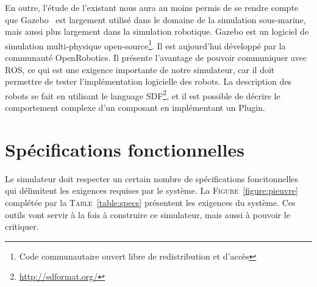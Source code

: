         En outre, l'étude de l'existant nous aura au moins permis de se rendre compte que \gls{Gazebo}~\cite{Koenig-gazebo} est largement utilisé dans le domaine de la simulation sous-marine, mais aussi plus largement dans la simulation robotique. \gls{Gazebo} est un logiciel de simulation multi-physique open-source\footnote{Code communautaire ouvert libre de redistribution et d'accès}. Il est aujourd'hui développé par la communauté \gls{OpenRobotics}. Il présente l'avantage de pouvoir communiquer avec \gls{ROS}, ce qui est une exigence importante de notre simulateur, car il doit permettre de tester l'implémentation logicielle des robots. La description des robots se fait en utilisant le language \gls{SDF}\footnote{\url{http://sdformat.org/}}, et il est possible de décrire le comportement complexe d'un composant en implémentant un \gls{Plugin}.


    \section{Spécifications fonctionnelles}
        \label{sec:spec_fonc}

        Le simulateur doit respecter un certain nombre de spécifications foncitonnelles qui délimitent les exigences requises par le système. La \textsc{Figure}~\ref{figure:pieuvre} complétée par la \textsc{Table}~\ref{table:specs} présentent les exigences du système. Ces outils vont servir à la fois à construire ce simulateur, mais aussi à pouvoir le critiquer.

